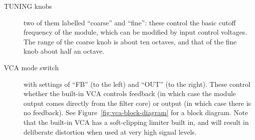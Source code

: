 \begin{description}
  \item[TUNING knobs] two of them labelled ``coarse'' and ``fine'':
    these control the basic
    cutoff frequency of the module, which can be modified by input control
    voltages.  The range of the coarse knob is about ten octaves, and that
    of the fine knob about half an octave.

  \item[VCA mode switch] with settings of ``FB'' (to the left) and ``OUT''
    (to the right).  These control whether the built-in VCA controls
    feedback (in which case the module output comes directly from the filter
    core) or output (in which case there is no feedback).  See
    Figure~\ref{fig:vca-block-diagram} for a block diagram.  Note that the
    built-in VCA has a soft-clipping limiter built in, and will result in
    deliberate distortion when used at very high signal levels.


\end{description}
